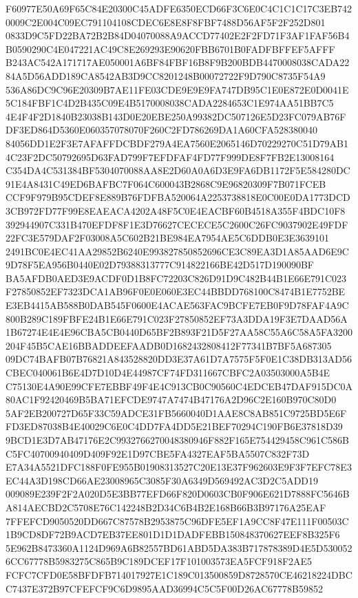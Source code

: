 \documentclass[UTF8,fontset=fandol,zihao=-4,a4paper]{ctexart}
\begin{document}
{{F60977E50A69F65C84E20300C45ADFE6350ECD66F3C6E0C4C1C1C17C3EB7420009C2E004C09EC791104108CDEC6E8E8F8FBF7488D56AF5F2F252D801
0833D9C5FD22BA72B2B84D04070088A9ACCD77402E2F2FD71F3AF1FAF56B4B0590290C4E047221AC49C8E269293E90620FBB6701B0FADFBFFEF5AFFF
B243AC542A171717AE050001A6BF84FBF16B8F9B200BDB4470008038CADA2284A5D56ADD189CA8542AB3D9CC8201248B00072722F9D790C8735F54A9
536A86DC9C96E20309B7AE11FE03CDE9E9E9FA747DB95C1E0E872E0D0041E5C184FBF1C4D2B435C09E4B5170008038CADA2284653C1E974AA51BB7C5
4E4F4F2D1840B23038B143D0E20EBE250A99382DC507126E5D23FC079AB76FDF3ED864D5360E060357078070F260C2FD786269DA1A60CFA528380040
84056DD1E2F3E7AFAFFDCBDF279A4EA7560E2065146D70229270C51D79AB14C23F2DC50792695D63FAD799F7EFDFAF4FD77F999DE8F7FB2E13008164
C354DA4C531384BF5304070088AA8E2D60A0A6D3E9FA6DB1172F5E584280DC91E4A8431C49ED6BAFBC7F064C600043B2868C9E96820309F7B071FCEB
CCF9F979B95CDEF8E889B76FDFBA520064A2253738818E0C00E0DA1773DCD3CB972FD77F99E8EAEACA4202A48F5C0E4EACBF60B4518A355F4BDC10F8
392944907C331B470EFDF8F1E3D76627CECECE5C2600C26FC9037902E49FDF22FC3E579DAF2F03008A5C602B21BE984EA7954AE5C6DDB0E3E3639101
2491BC0E4EC41AA29852B6240E993827850852696CE3C89EA3D1A85AAD6E9C9D78F5EA956B0440E02D79388313777C914822166BE42D517D190090BF
BA5AFDB0AED3E9ACDF0D1B8FC72203C826D91D9C482B44B1E66E791C023F27850852EF7323DCA1AB96F0E0E060E3EC44BBDD768100C8474B1E7752BE
E3EB4415AB588B0DAB545F0600E4ACAE563FAC9BCFE7EB0F9D78FAF4A9C800B289C189FBFE24B1E66E791C023F27850852EF73A3DDA19F3E7DAAD56A
1B67274E4E4E96CBA5CB0440D65BF2B893F21D5F27AA58C55A6C58A5FA3200204F45B5CAE16BBADDEEFAADB0D1682432808412F77341B7BF5A687305
09DC74BAFB07B76821A843528820DD3E37A61D7A7575F5F0E1C38DB313AD56CBEC040061B6E4D7D10D4E44987CF74FD311667CBFC2A03503000A5B4E
C75130E4A90E99CFE7EBBF49F4E4C913CB0C90560C4EDCEB47DAF915DC0A80AC1F92420469B5BA71EFCDE9747A7474B47176A2D96C2E160B970C80D0
5AF2EB200727D65F33C59ADCE31FB5660040D1AAE8C8AB851C9725BD5E6FFD3ED87038B4E40029C6E0C4DD7FA4DD5E21BEF70294C190FB6E37818D39
9BCD1E3D7AB47176E2C9932766270048380946F882F165E754429458C961C586BC5FC40700940409D409F92E1D97CBE5FA4327EAF5BA5507C832F73D
E7A34A5521DFC188F0FE955B01908313527C20E13E37F962603E9F3F7EFC78E3EC44A3D198CD66AE23008965C3085F30A6349D569492AC3D2C5ADD19
009089E239F2F2A020D5E3BB77EFD66F820D0603CB0F906E621D7888FC5646BA814AECBD2C5708E76C142248B2D34C6B4B2E168B66B3B97176A25EAF
7FFEFCD9050520DD667C87578B2953875C96DFE5EF1A9CC8F47E111F00503C1B9CD8DF72B9ACD7EB37EE801D1D1DADFEBB150848370627EEF8B325F6
5E962B8473360A1124D969A6B82557BD61ABD5DA383B717878389D4E5D5300526CC67778B5983275C865B9C189DCEF17F101003573EA5FCF918F2AE5
FCFC7CFD0E58BFDFB714017927E1C189C013500859D8728570CE46218224DBCC7437E372B97CFEFCF9C6D9895AAD36994C5C5F00D26AC67778B59852
}}
\end{document}
